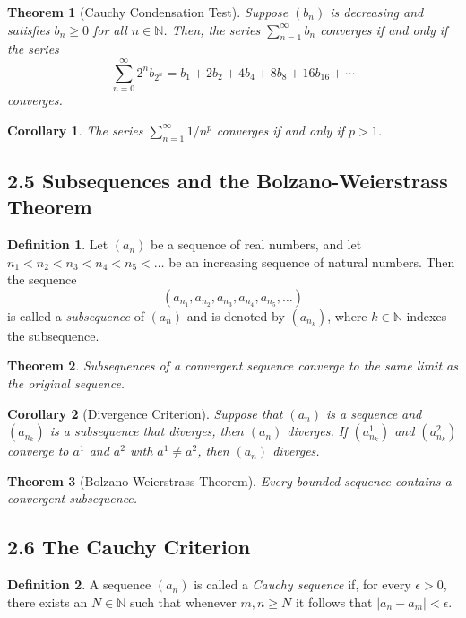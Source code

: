 \documentclass{amsart}
\newtheorem*{theorem}{Theorem}
\newtheorem*{corollary}{Corollary}
\theoremstyle{definition}
\newtheorem*{definition}{Definition}
\newcommand{\N}{\mathbb{N}}
\newcommand{\abs}[1]{|#1|}
\begin{document}
\begin{theorem}[Cauchy Condensation Test]
  Suppose $(b_n)$ is decreasing and satisfies $b_n \ge 0$ for all $n \in \N$.
  Then, the series $\sum_{n=1}^{\infty} b_n$ converges if and only if the series
  \[
    \sum_{n=0}^{\infty} 2^n b_{2^n} = b_1 + 2 b_2 + 4 b_4 + 8 b_8 + 16 b_{16} +
    \cdots
  \]
  converges.
\end{theorem}

\begin{corollary}
  The series $\sum_{n=1}^\infty 1 / n^p$ converges if and only if $p > 1$.
\end{corollary}

\subsection*{2.5 Subsequences and the Bolzano-Weierstrass Theorem}

\begin{definition}
  Let $(a_n)$ be a sequence of real numbers, and let $n_1 < n_2 < n_3 < n_4 <
  n_5 < \ldots$ be an increasing sequence of natural numbers. Then the sequence
  \[
    (a_{n_1}, a_{n_2}, a_{n_3}, a_{n_4}, a_{n_5}, \ldots)
  \]
  is called a \emph{subsequence} of $(a_n)$ and is denoted by $(a_{n_k})$, where
  $k \in \N$ indexes the subsequence.
\end{definition}

\begin{theorem}
  Subsequences of a convergent sequence converge to the same limit as the
  original sequence.
\end{theorem}

\begin{corollary}[Divergence Criterion]
  Suppose that $(a_n)$ is a sequence and $(a_{n_k})$ is a subsequence that
  diverges, then $(a_n)$ diverges. If $(a^1_{n_k})$ and $(a^2_{n_k})$ converge
  to $a^1$ and $a^2$ with $a^1 \neq a^2$, then $(a_n)$ diverges.
\end{corollary}

\begin{theorem}[Bolzano-Weierstrass Theorem]
  Every bounded sequence contains a convergent subsequence.
\end{theorem}

\subsection*{2.6 The Cauchy Criterion}

\begin{definition}
  A sequence $(a_n)$ is called a \emph{Cauchy sequence} if, for every $\epsilon
  > 0$, there exists an $N \in \N$ such that whenever $m, n \ge N$ it follows
  that $\abs{a_n - a_m} < \epsilon$.
\end{definition}
\end{document}

